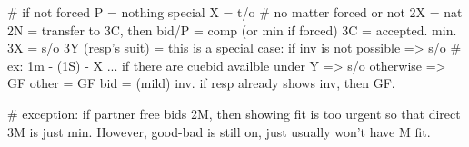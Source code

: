 # if not forced
P = nothing special
X = t/o
# no matter forced or not
2X = nat
2N = transfer to 3C, then bid/P = comp (or min if forced)
    3C = accepted. min.
    3X = s/o
    3Y (resp's suit) = this is a special case:
        if inv is not possible => s/o  # ex: 1m - (1S) - X ...
        if there are cuebid availble under Y => s/o
        otherwise => GF
    other = GF
bid = (mild) inv. if resp already shows inv, then GF.

# exception: if partner free bids 2M, then showing fit is too urgent so that direct 3M is just min. However, good-bad is still on, just usually won't have M fit.